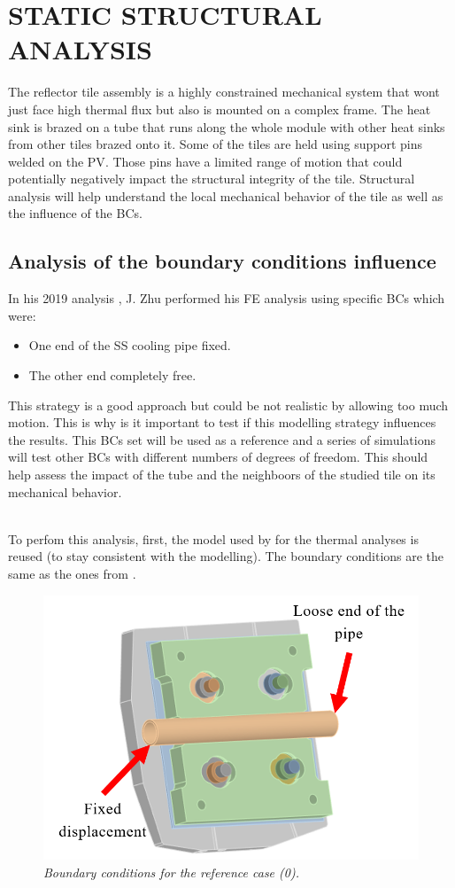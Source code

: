 \section{STATIC STRUCTURAL ANALYSIS}
\normalsize{The reflector tile assembly is a highly constrained mechanical system that wont just face high thermal flux but also is mounted on a complex frame. The heat sink is brazed on a tube that runs along the whole module with other heat sinks from other tiles brazed onto it. Some of the tiles are held using support pins welded on the \acrshort{PV}. Those pins have a limited range of motion that could potentially negatively impact the structural integrity of the tile. Structural analysis will help understand the local mechanical behavior of the tile as well as the influence of the \acrshort{BCs}.}
\subsection{Analysis of the boundary conditions influence}
\normalsize{In his 2019 analysis \cite{zhu_parametric_2019}, J. Zhu performed his \acrshort{FE} analysis using specific \acrshort{BCs} which were:
\begin{itemize}
    \item One end of the \acrshort{SS} cooling pipe fixed.
    \item The other end completely free. 
\end{itemize}
This strategy is a good approach but could be not realistic by allowing too much motion. This is why is it important to test if this modelling strategy influences the results. This \acrshort{BCs} set will be used as a reference and a series of simulations will test other \acrshort{BCs} with different numbers of degrees of freedom. This should help assess the impact of the tube and the neighboors of the studied tile on its mechanical behavior.}
\\
\break
\normalsize{\indent To perfom this analysis, first, the model used by for the thermal analyses is reused (to stay consistent with the modelling). The boundary conditions are the same as the ones from \cite{zhu_parametric_2019}.}
\\
\begin{figure}[!ht]
    \label{fig_5_14} 
    \centering
    \includegraphics[width=.8\textwidth]{figures/BCStructuralConfig.png}
    \caption{\it Boundary conditions for the reference case (0).}
\end{figure}
